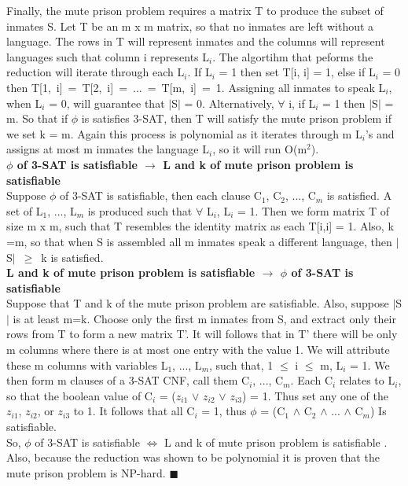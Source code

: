 \documentclass[10pt]{csc_assignment}
\begin{document}
\begin{description}
Finally, the mute prison problem requires a matrix T to produce the subset of inmates S. Let T be an m x m matrix, so that no inmates are left without a language. The rows in T will represent inmates and the columns will represent languages such that column i represents L$_{i}$. The algortihm that peforms the reduction will iterate through each L$_{i}$. If L$_{i}$ = 1 then set T[i, i] = 1, else if L$_{i}$ =  0 then \mbox{T[1, i] = T[2, i] = ... = T[m, i] = 1}. Assigning all inmates to speak L$_{i}$, when L$_{i}$ = 0, will guarantee that $\mid$S$\mid$ = 0. Alternatively, $\forall$ i, if L$_{i}$ = 1 then $\mid$S$\mid$ = m. So that if $\phi$ is satisfies 3-SAT, then T will satisfy the mute prison problem if we set k = m. Again this process is polynomial as it iterates through m L$_{i}$'s and assigns at most m inmates the language L$_{i}$, so it will run O(m$^{2}$).\\
\textbf{$\phi$ of 3-SAT is satisfiable $\rightarrow$ L and k of mute prison problem is satisfiable}\\
Suppose $\phi$ of 3-SAT is satisfiable, then each clause C$_{1}$, C$_{2}$, ..., C$_{m}$ is satisfied. A set of L$_{1}$, ..., L$_{m}$ is produced such that $\forall$ L$_{i}$, L$_{i}$ = 1. Then we form matrix T of size m x m, such that T resembles the identity matrix as each T[i,i] = 1. Also, k =m, so that when S is assembled all m inmates speak a different language, then \mbox{$\mid$S$\mid$ $\geqslant$ k} is satisfied.\\ 
\textbf{L and k of mute prison problem is satisfiable $\rightarrow$ $\phi$ of 3-SAT is satisfiable}\\
Suppose that T and k of the mute prison problem are satisfiable. Also, suppose $\mid$S$\mid$ is at least m=k. Choose only the first m inmates from S, and extract only their rows from T to form a new matrix T'. It will follows that in T' there will be only m columns where there is at most one entry with the value 1. We will attribute these m columns with variables L$_{1}$, ..., L$_{m}$, such that, 1 $\leqslant$ i $\leqslant$ m, L$_{i}$ = 1. We then form m clauses of a 3-SAT CNF, call them C$_{i}$, ..., C$_{m}$. Each C$_{i}$ relates to L$_{i}$, so that the boolean value of C$_{i}$ = ($z_{i1}$ $\lor$ $z_{i2}$ $\lor$ $z_{i3}$) = 1. Thus set any one of the $z_{i1}$, $z_{i2}$, or $z_{i3}$ to 1. It follows that all C$_{i}$ = 1, thus $\phi$ = (C$_{1}$ $\land$ C$_{2}$ $\land$ ... $\land$ C$_{m}$) Is satisfiable.\\

So, $\phi$ of 3-SAT is satisfiable $\Leftrightarrow$ L and k of mute prison problem is satisfiable . Also, because the reduction was shown to be polynomial it is proven that the mute prison problem is NP-hard. $\blacksquare$\\


\end{description}
\end{document}
